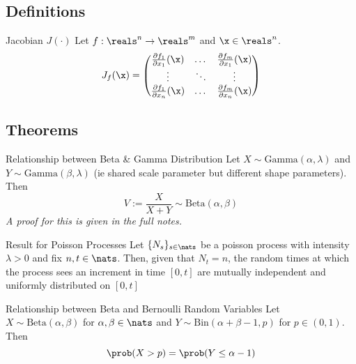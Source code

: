 \documentclass[11pt,a4paper]{article}
\begin{document}
\subsection{Definitions}

  \begin{definition}{Jacobian $J(\cdot)$}
    Let $f:\reals^n\to\reals^m$ and $\x\in\reals^n$.
    \[ J_f(\x)=\begin{pmatrix}
      \frac{\partial f_1}{\partial x_1}(\x)&\dots&\frac{\partial f_m}{\partial x_1}(\x)\\
      \vdots&\ddots&\vdots\\
      \frac{\partial f_1}{\partial x_n}(\x)&\dots&\frac{\partial f_m}{\partial x_n}(\x)
    \end{pmatrix} \]
  \end{definition}

\subsection{Theorems}

  \begin{theorem}{Relationship between Beta \& Gamma Distribution}
    Let $X\sim\text{Gamma}(\alpha,\lambda)$ and $Y\sim\text{Gamma}(\beta,\lambda)$ (ie shared scale parameter but different shape parameters). Then
    \[ V:=\frac{X}{X+Y}\sim\text{Beta}(\alpha,\beta) \]
    \textit{A proof for this is given in the full notes.}
  \end{theorem}

  \begin{theorem}{Result for Poisson Processes}
    Let $\{N_s\}_{s\in\nats}$ be a poisson process with intensity $\lambda>0$ and fix $n,t\in\nats$. Then, given that $N_t=n$, the random times at which the process sees an increment in time $[0,t]$ are mutually independent and uniformly distributed on $[0,t]$
  \end{theorem}

  \begin{theorem}{Relationship between Beta and Bernoulli Random Variables}
    Let $X\sim\text{Beta}(\alpha,\beta)$ for $\alpha,\beta\in\nats$ and $Y\sim\text{Bin}(\alpha+\beta-1,p)$ for $p\in(0,1)$. Then
    \[ \prob(X>p)=\prob(Y\leq\alpha-1) \]
  \end{theorem}
\end{document}
